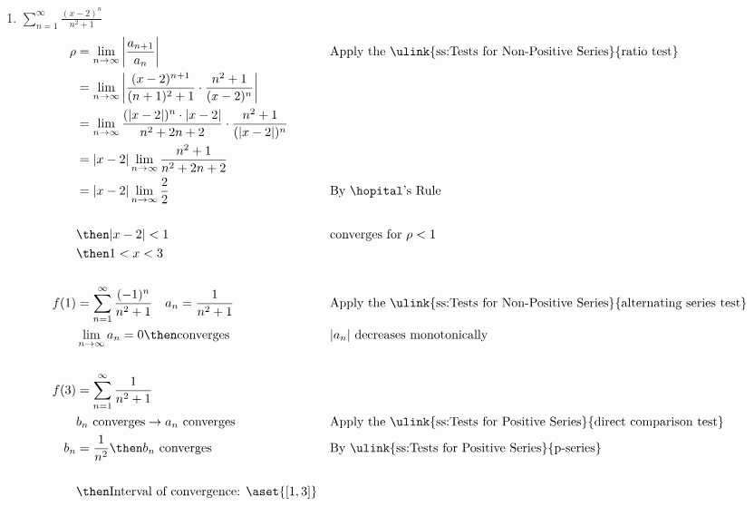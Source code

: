 \begin{enumerate}
\begin{enumerate}[itemsep=24em]
    \item \(\displaystyle \sum_{n=1}^{\infty} \frac{(x-2)^n}{n^2+1} \)
      \begin{align*}
      \rho &= \lim_{n \to \infty} \left| \frac{a_{n+1}}{a_n}  \right|
           && \text{Apply the \ulink{ss:Tests for Non-Positive Series}{ratio test}} \\
           &= \lim_{n \to \infty} \left|
           \frac{(x-2)^{n+1}}{(n+1)^2 + 1} \cdot
           \frac{n^2+1}{(x-2)^n}
           \right| \\
           &= \lim_{n \to \infty}
           \frac{(|x-2|)^n \cdot |x-2|}{n^2 + 2n + 2} \cdot
           \frac{n^2+1}{(|x-2|)^n} \\
           &= |x-2| \lim_{n \to \infty}
           \frac{n^2 + 1}{n^2+2n+2} \\
           &= |x-2| \lim_{n \to \infty}
           \frac{2}{2}
           && \text{By \hopital's Rule} \\
           \\
           &\then |x-2| < 1
           && \text{converges for } \rho <1 \\
           &\then 1 < x < 3 \\
           \\
           f(1) &= \sum_{n=1}^{\infty} \frac{(-1)^n}{n^2 + 1}
           \quad a_n = \frac{1}{n^2 + 1}
           && \text{Apply the \ulink{ss:Tests for Non-Positive Series}{alternating series test}} \\
           &\lim_{n \to \infty} a_n = 0
           \then \text{converges}
           && |a_n|~\text{decreases monotonically}\\
           \\
           f(3) &= \sum_{n=1}^{\infty} \frac{1}{n^2 + 1}\\
                & b_n ~\text{converges} \to a_n~\text{converges}~
                && \text{Apply the \ulink{ss:Tests for Positive Series}{direct comparison test}} \\
           b_n &= \frac{1}{n^2} \then b_n ~\text{converges}
                && \text{By \ulink{ss:Tests for Positive Series}{p-series}} \\
                \\
                &\then \text{Interval of convergence: }
                \aset{\left[ 1, 3 \right] }
      \end{align*}
  \end{enumerate}

\newpage %


\end{enumerate}
